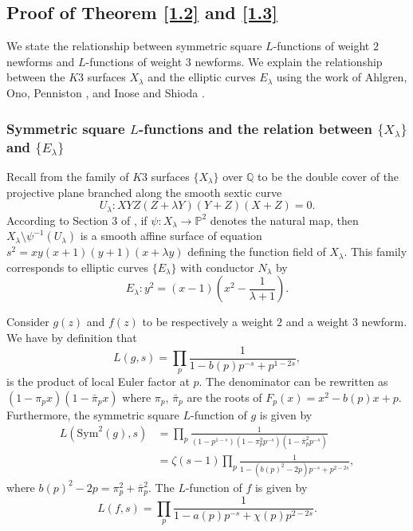 \documentclass[12pt]{amsart}
\newcommand{\Q}{\mathbb{Q}}
\numberwithin{equation}{section}
\begin{document}
\subsection{Proof of Theorem \ref{1.2} and \ref{1.3}}

We state the relationship between symmetric square $L$-functions of weight $2$ newforms and $L$-functions of weight $3$ newforms. We explain the relationship between the $K3$ surfaces $X_\lambda$ and the elliptic curves $E_\lambda$ using the work of Ahlgren, Ono, Penniston \cite{AOP}, and Inose and Shioda \cite{IS,Shioda}.  
\subsubsection{Symmetric square $L$-functions and the relation between $\{X_\lambda\}$ and $\{E_\lambda\}$}{\label{ZetaFunction}}\hfill

\vspace{3mm}
Recall from \cite{AOP} the family of $K3$ surfaces $\{X_\lambda \}$ over $\Q$ to be the double cover of the projective plane branched along the smooth sextic curve $$U_\lambda : XYZ(Z+\lambda Y)(Y+Z)(X+Z)=0.$$ According to Section 3 of \cite{AOP}, if $\psi:X_\lambda\to \mathbb{P}^2$ denotes the natural map, then $X_\lambda\setminus \psi^{-1}(U_\lambda)$ is a smooth affine surface of equation $s^2=xy(x+1)(y+1)(x+\lambda y)$ defining the function field of $X_\lambda$. This family corresponds to elliptic curves $\{E_\lambda\}$ with conductor $N_\lambda$ %
by $$E_\lambda : y^2=(x-1)\left(x^2-\frac{1}{\lambda+1}\right).$$

Consider $g(z)$ and $f(z)$ to be respectively a weight $2$ and a weight $3$ newform. We have by definition that $$L(g,s)=\prod_p\frac{1}{1-b(p)p^{-s}+p^{1-2s}},$$ is the product of local Euler factor at $p$. The denominator can be rewritten as $(1-\pi_{p}x)(1-\bar{\pi}_{p}x)$ where $\pi_{p},\,\bar{\pi}_{p}$ are the roots of $F_p(x)=x^2-b(p)x+p$. Furthermore, the symmetric square $L$-function of $g$ is given by
\begin{equation}
    \begin{aligned}
    L(\mathrm{Sym}^2(g),s)&=\prod_p\frac{1}{(1-p^{1-s})(1-\pi_p^2p^{-s})(1-\bar{\pi}_p^2p^{-s})}\\&=\zeta(s-1)\prod_p\frac{1}{1-(b(p)^2-2p)p^{-s}+p^{2-2s}},
    \end{aligned}
\end{equation}
where $b(p)^2-2p=\pi_p^2+\bar{\pi}_p^2$. The $L$-function of $f$ is given by $$L(f,s)=\prod_p\frac{1}{1-a(p)p^{-s}+\chi(p)p^{2-2s}}.$$
 
\end{document}

